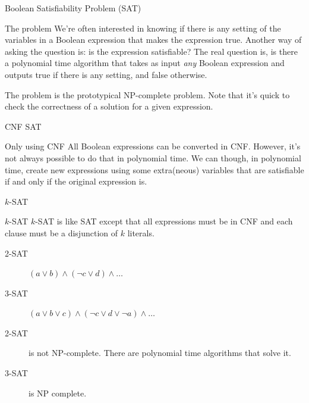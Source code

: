 \begin{frame}{Boolean Satisfiability Problem (SAT)}
  
  {
    \begin{block}{The problem}
    We're often interested in knowing if there is any setting of the variables in a Boolean expression that makes the expression true.
    Another way of asking the question is: is the expression satisfiable?
    The real question is, is there a polynomial time algorithm that takes as input \emph{any} Boolean expression and outputs true if there is any setting, and false otherwise.
  \end{block}}
  \vspace{0.5cm}
  The problem is the prototypical NP-complete problem.
  Note that it's quick to check the correctness of a solution for a given expression. 
\end{frame}


\begin{frame}{CNF SAT}
  
  {
    \begin{block}{Only using CNF}
    All Boolean expressions can be converted in CNF.
    However, it's not always possible to do that in polynomial time.
    We can though, in polynomial time, create new expressions using some extra(neous) variables that are satisfiable if and only if the original expression is.
  \end{block}}
  \vspace{0.5cm} 
\end{frame}

\begin{frame}{$k$-SAT}
  
  {
    \begin{block}{$k$-SAT}
     $k$-SAT is like SAT except that all expressions must be in CNF and each clause must be a disjunction of $k$ literals.
  \end{block}}
  \vspace{0.25cm}
  \begin{description}
  \item[2-SAT] $(a \vee b) \wedge (\neg c \vee d) \wedge \ldots$
  \vspace{0.25cm}
  \item[3-SAT] $(a \vee b \vee c) \wedge (\neg c \vee d \vee \neg a) \wedge \ldots$
  \end{description}
    \vspace{0.25cm}
   \begin{description}
     \item[2-SAT] is not NP-complete. There are polynomial time algorithms that solve it.
     \vspace{0.25cm}
     \item[3-SAT] is NP complete.
   \end{description}
\end{frame}

